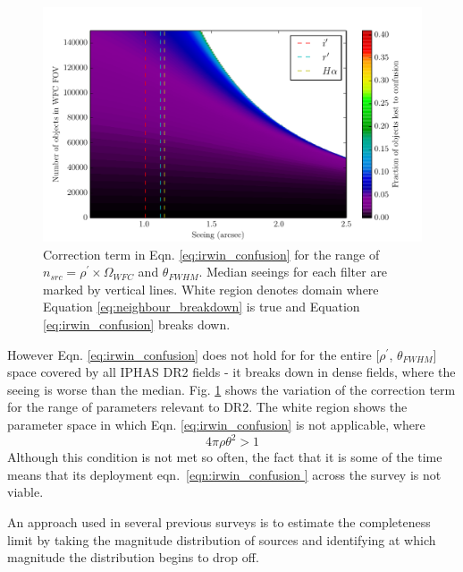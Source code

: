 \documentclass[a4paper,useAMS,usenatbib]{mn2e}
\begin{document}
\begin{figure}
\begin{center}
\includegraphics[width=1\linewidth]{figures/neighbour_breakdown.pdf} 
\caption{\footnotesize Correction term in Eqn. \ref{eq:irwin_confusion} for the range of $n_{src} = \rho^{\prime} \times \Omega_{WFC}$ and $\theta_{FWHM}$. Median seeings for each filter are marked by vertical lines. White region denotes domain where Equation \ref{eq:neighbour_breakdown} is true and Equation \ref{eq:irwin_confusion} breaks down.}
\label{fig:neighbour_breakdown}
\end{center}
\end{figure}

However Eqn. \ref{eq:irwin_confusion} does not hold for for the entire
[$\rho^{\prime}$, $\theta_{FWHM}$] space covered by all IPHAS DR2 fields - it
breaks down in dense fields, where the seeing is worse than the median. Fig.
\ref{fig:neighbour_breakdown} shows the variation of the correction term for the range of parameters relevant
to DR2. The white region shows the parameter space in which Eqn. \ref{eq:irwin_confusion} is not 
applicable, where
\begin{equation}
4\pi\rho\theta^{2} > 1
\label{eq:neighbour_breakdown}
\end{equation}
Although this condition is not met so often, the fact that it is some of the time means that its deployment 
eqn.~\ref{eqn:irwin_confusion } across the survey is not viable. 

An approach used in several previous
surveys \citep{Ruphy1997, Cambresy2002, Lucas2008} is to estimate the
completeness limit by taking the magnitude distribution of sources and
identifying at which magnitude the distribution begins to drop off.
\end{document}
